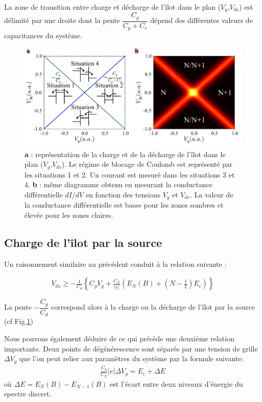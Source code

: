 La zone de transition entre charge et décharge de l'\^ilot dans le plan ($V_g$,$V_{ds}$) est délimité par une droite dont la pente $\dfrac{C_g}{C_g + C_s}$ dépend des différentes valeurs de capacitances du système.


\begin{figure}
\includegraphics[scale=0.45]{Annexe2/figure3/figure3.pdf} 
\caption{\textbf{a} : représentation de la charge et de la décharge de l'\^ilot dans le plan ($V_g$,$V_{ds}$). Le régime de blocage de Coulomb est représenté par les situations 1 et 2. Un courant est mesuré dans les situations 3 et 4. \textbf{b} : m\^eme diagramme obtenu en mesurant la conductance différentielle $dI/dV$ en fonction des tensions $V_g$ et $V_{ds}$. La valeur de la conductance différentielle est basse pour les zones sombres et élevée pour les zones claires.}
\label{charge_discharge}
\end{figure}



\subsection{Charge de l'\^ilot par la source}
Un raisonnement similaire au précédent conduit à la relation suivante :

\begin{eqnarray}
V_{ds} \geq -\frac{1}{C_d} \left\lbrace C_gV_g + \frac{C_{\Sigma}}{|e|}\left( E_N(B) + (N-\frac{1}{2})E_c \right) \right\rbrace
\end{eqnarray}


La pente $-\dfrac{C_g}{C_d}$ correspond alors à la charge ou la décharge de l'\^ilot par la source (cf Fig.\ref{charge_discharge})

Nous pouvons également déduire de ce qui précède une deuxième relation importante. Deux points de dégénérescence sont séparés par une tension de grille $\Delta V_g$ que l'on peut relier aux paramètres du système par la formule suivante:
\begin{eqnarray}
\frac{C_g}{C_{\Sigma}} |e| \Delta V_g = E_c + \Delta E
\end{eqnarray}
où $\Delta E = E_N(B) - E_{N-1}(B)$ est l'écart entre deux niveaux d'énergie du spectre discret.



